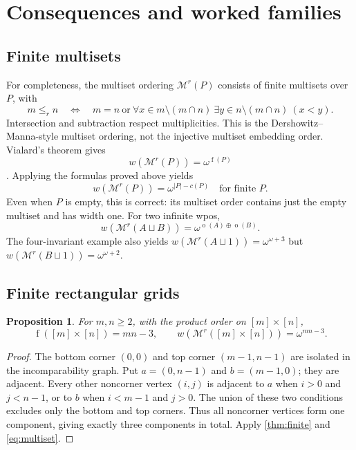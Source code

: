 \documentclass[11pt,a4paper]{article}
\newtheorem{proposition}[proposition]{Proposition}
\theoremstyle{definition}
\theoremstyle{remark}
\DeclareMathOperator{\mot}{o}
\DeclareMathOperator{\fot}{f}
\newcommand{\ds}{\mathbin{\sqcup}}
\newcommand{\Mr}{\mathcal M^{r}}
\begin{document}
\section{Consequences and worked families}\label{sec:applications}

\subsection{Finite multisets}

For completeness, the multiset ordering $\Mr(P)$ consists of finite
multisets over $P$, with
\[
m\leq_r n\quad\Longleftrightarrow\quad
m=n\ \text{or}\ 
\forall x\in m\setminus(m\cap n)\ 
\exists y\in n\setminus(m\cap n)\ (x<y).
\]
Intersection and subtraction respect multiplicities. This is the
Dershowitz--Manna-style multiset ordering, not the injective multiset
embedding order. Vialard's theorem gives
\begin{equation}\label{eq:multiset}
w(\Mr(P))=\omega^{\fot(P)}
\end{equation}
\cite[Theorem~3.4]{Vialard2023}. Applying the formulas proved above yields
\[
\boxed{w(\Mr(P))=\omega^{|P|-c(P)}\quad\text{for finite }P.}
\]
Even when $P$ is empty, this is correct: its multiset order contains just
the empty multiset and has width one. For two infinite wpos,
\[
w(\Mr(A\ds B))=\omega^{\mot(A)\oplus\mot(B)}.
\]
The four-invariant example also yields
$w(\Mr(A\ds1))=\omega^{\omega+3}$ but
$w(\Mr(B\ds1))=\omega^{\omega+2}$.

\subsection{Finite rectangular grids}

\begin{proposition}\label{prop:grids}
For $m,n\geq2$, with the product order on $[m]\times[n]$,
\[
\fot([m]\times[n])=mn-3,
\qquad
w(\Mr([m]\times[n]))=\omega^{mn-3}.
\]
\end{proposition}
\begin{proof}
The bottom corner $(0,0)$ and top corner $(m-1,n-1)$ are isolated in the
incomparability graph. Put $a=(0,n-1)$ and $b=(m-1,0)$; they are adjacent.
Every other noncorner vertex $(i,j)$ is adjacent to $a$ when
$i>0$ and $j<n-1$, or to $b$ when $i<m-1$ and $j>0$. The union of these two
conditions excludes only the bottom and top corners. Thus all noncorner
vertices form one component, giving exactly three components in total.
Apply \cref{thm:finite} and \eqref{eq:multiset}.
\end{proof}
\end{document}
